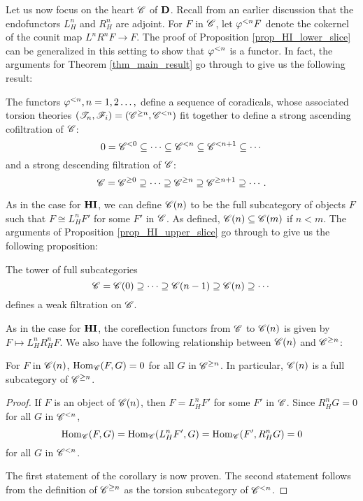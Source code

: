 Let us now focus on the heart $\Cat{C}$ of $\DCat$. Recall from
an earlier discussion that the endofunctors $L_H^n$ and $R_H^n$ 
are adjoint. For $F$ in $\Cat{C}$, let $\corad{n} F$ denote the 
cokernel of the counit map $L^n R^n F \to F$. The proof of 
Proposition \ref{prop_HI_lower_slice} can be generalized in this 
setting to show that $\corad{n}$ is a functor. In fact, the 
arguments for Theorem \ref{thm_main_result} go through to give us
the following result:

\begin{thm}\label{thm_sum_heart}
The functors $\corad{n}, n = 1, 2\dots,$ define a sequence of
coradicals, whose associated torsion theories $(\Cat{T}_n,
\Cat{F}_i) = (\Prerad{n}{\Cat{C}}, \Corad{n}{\Cat{C}})$ fit together
to define a strong ascending cofiltration of $\Cat{C}$:
\[
0 = \Corad{0}{\Cat{C}} \subseteq \cdots \subseteq \Corad{n}{\Cat{C}}
   \subseteq \Corad{n + 1}{\Cat{C}} \subseteq \cdots
\]
and a strong descending filtration of $\Cat{C}$:
\[
\Cat{C} = \Prerad{0}{\Cat{C}} \supseteq \cdots \supseteq \Prerad{n}{\Cat{C}}
\supseteq \Prerad{n + 1}{\Cat{C}} \supseteq \cdots.
\]
\end{thm}

As in the case for $\HI$, we can define $\SGFilt{n}{\Cat{C}}$ to be
the full subcategory of objects $F$ such that $F \cong L_H^nF'$
for some $F'$ in $\Cat{C}$. As defined, $\SGFilt{n}{\Cat{C}}
\subseteq \SGFilt{m}{\Cat{C}}$ if $n < m$. The arguments of 
Proposition \ref{prop_HI_upper_slice} go through to give us the 
following proposition:

\begin{prop}
The tower of full subcategories
\[
\Cat{C} = \SGFilt{0}{\Cat{C}} \supseteq \cdots \supseteq \SGFilt{n - 1}{\Cat{C}}
\supseteq \SGFilt{n}{\Cat{C}} \supseteq \cdots
\]
defines a weak filtration on $\Cat{C}$.
\end{prop}

As in the case for $\HI$, the coreflection functors from $\Cat{C}$ 
to $\SGFilt{n}{\Cat{C}}$ is given by $F \mapsto L_H^n R_H^n F$. We 
also have the following relationship between $\SGFilt{n}{\Cat{C}}$ 
and $\Prerad{n}{\Cat{C}}$:

\begin{cor}\label{cor_sg_sub_prerad}
For $F$ in $\SGFilt{n}{\Cat{C}}$, $\hom_{\Cat{C}}(F, G) = 0$ for
all $G$ in $\Prerad{n}{\Cat{C}}$. In particular, $\SGFilt{n}{\Cat{C}}$
is a full subcategory of $\Prerad{n}{\Cat{C}}$.
\end{cor}
\begin{proof}
If $F$ is an object of $\SGFilt{n}{\Cat{C}}$, then $F = L_H^n F'$ for
some $F'$ in $\Cat{C}$. Since $R_H^n G = 0$ for all $G$ in 
$\Corad{n}{\Cat{C}}$,
\[
\hom_{\Cat{C}}(F, G) = \hom_{\Cat{C}}(L_H^n F', G) = \hom_{\Cat{C}}(F', R_H^n G) = 0
\]
for all $G$ in $\Corad{n}{\Cat{C}}$.

The first statement of the corollary is now proven. The second 
statement follows from the definition of $\Prerad{n}{\Cat{C}}$ as 
the torsion subcategory of $\Corad{n}{\Cat{C}}$.
\end{proof}

